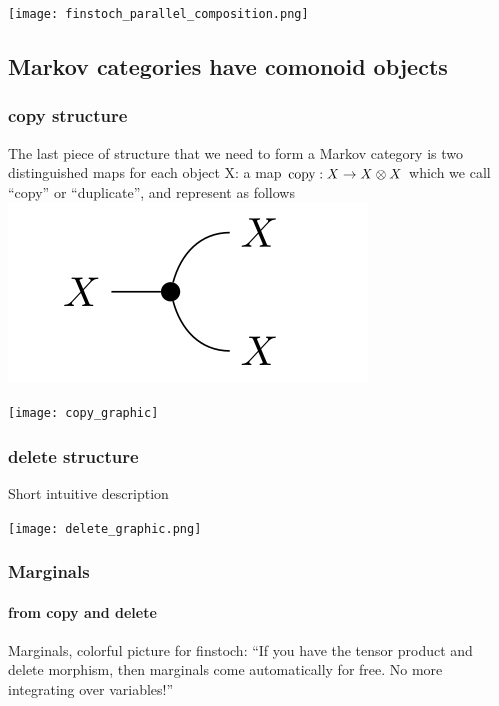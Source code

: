 \begin{frame}
    \begin{center}
        \texttt{[image: finstoch\_parallel\_composition.png]}
    \end{center}
\end{frame}

\subsection{Markov categories have comonoid objects}
\begin{frame}
    \frametitle{copy structure}
    \begin{minipage}{.55\textwidth}
        The last piece of structure that we need to form a Markov category is two distinguished maps for each object X: a map $\text{\normalfont copy}: X\to X\otimes X$ which we call “copy” or “duplicate”, and represent as follows
        \includegraphics[width=.4\textwidth]{graphics/string/markov_copy.png}
    \end{minipage}
    \hfill
    \begin{minipage}{.4\textwidth}
        \texttt{[image: copy\_graphic]}
    \end{minipage}
\end{frame}


\begin{frame}
    \frametitle{delete structure}
    \begin{minipage}{.48\textwidth}
        Short intuitive description
    \end{minipage}
    \hfill
    \begin{minipage}{.48\textwidth}
        \texttt{[image: delete\_graphic.png]}
    \end{minipage}
\end{frame}

\begin{frame}[t]
    \frametitle{Marginals}
    \framesubtitle{from copy and delete}
    Marginals, colorful picture for finstoch: “If you have the tensor product and delete morphism, then marginals come automatically for free. No more integrating over variables!”
\end{frame}


